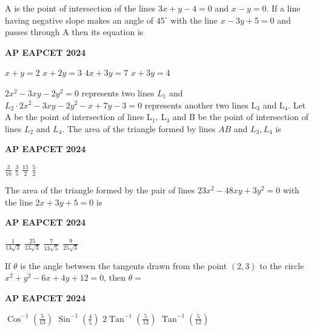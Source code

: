 \documentclass[11pt,paper=a4,answers]{exam}
\begin{document}
\begin{multicols}{2}
\begin{questions}
\question
A is the point of intersection of the lines $3 x+y-4=0$ and $x-y=0$. If a line having negative slope makes an angle of $45^{\circ}$ with the line $x-3 y+5=0$ and passes through A then its equation is
\begin{flushright}
\small\textbf{AP EAPCET 2024}
\end{flushright}
\begin{choices}
  \choice $x+y=2$
  \choice $x+2y=3$
  \choice $4x+3y=7$ 
  \choice $x+3y=4$
\end{choices}

\question
$2 x^2-3 x y-2 y^2=0$ represents two lines $L_1$ and $L_2 \cdot 2 x^2-3 x y-2 y^2-x+7 y-3=0$ represents another two lines $\mathrm{L}_3$ and $\mathrm{L}_4$. Let A be the point of intersection of lines $\mathrm{L}_1, \mathrm{~L}_3$ and B be the point of intersection of lines $L_2$ and $L_4$. The area of the triangle formed by lines $A B$ and $L_3, L_4$ is
\begin{flushright}
\small\textbf{AP EAPCET 2024}
\end{flushright}
\begin{choices}
  \choice $\frac{3}{10}$
  \choice $\frac{3}{5}$
  \choice $\frac{15}{2}$
  \choice $\frac{5}{2}$
\end{choices}

\question
The area of the triangle formed by the pair of lines $23 x^2-48 x y+3 y^2=0$ with the line $2 x+3 y+5=0$ is
\begin{flushright}
\small\textbf{AP EAPCET 2024}
\end{flushright}
\begin{choices}
  \choice $\frac{1}{13 \sqrt{3}} $
  \choice $\frac{25}{13 \sqrt{3}}$ 
  \choice $\frac{7}{13 \sqrt{5}}$ 
  \choice $\frac{9}{25 \sqrt{3}}$
\end{choices}

\question
If $\theta$ is the angle between the tangents drawn from the point $(2,3)$ to the circle $x^2+y^2-6 x+4 y+12=0$, then $\theta=$
\begin{flushright}
\small\textbf{AP EAPCET 2024}
\end{flushright}
\begin{choices}
  \choice $\operatorname{Cos}^{-1}\left(\frac{5}{13}\right)$
  \choice $\operatorname{Sin}^{-1}\left(\frac{4}{5}\right)$
  \choice $2 \operatorname{Tan}^{-1}\left(\frac{5}{12}\right)$
  \choice $\operatorname{Tan}^{-1}\left(\frac{5}{12}\right)$
\end{choices}


\end{questions}
\end{multicols}
\end{document}
